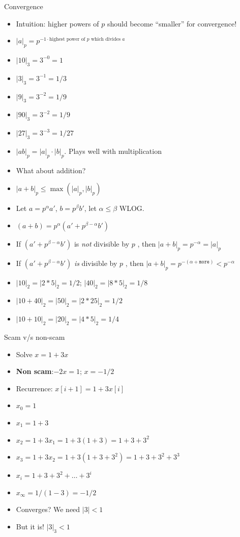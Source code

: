 \documentclass[8pt]{beamer}
\begin{document}
\begin{frame}{Convergence}

\begin{itemize}
\item Intuition: higher powers of $p$ should become ``smaller'' for convergence! \pause
\item $|a|_p = p^{-1 \cdot \text{highest power of } p \text { which divides } a}$\pause
\item $|10|_3 = 3^{-0} = 1$\pause
\item $|3|_3 = 3^{-1} = 1/3$\pause
\item $|9|_3 = 3^{-2} = 1/9$\pause
\item $|90|_3 = 3^{-2} = 1/9$\pause
\item $|27|_3 = 3^{-3} = 1/27$\pause
\item $|ab|_p = |a|_p \cdot |b|_p$. Plays well with multiplication \pause
\item What about addition? \pause
\item $|a+b|_p \leq \max(|a|_p, |b|_p)$\pause
\item Let $a = p^\alpha a'$, $b = p^\beta b'$, let $\alpha \leq \beta$ WLOG.\pause
\item $(a + b) = p^\alpha (a' + p^{\beta - \alpha} b')$\pause
\item If $(a' + p^{\beta - \alpha} b')$ is \emph{not} divisible by $p$ \pause , then $|a+b|_p = p^{-\alpha} = |a|_p$\pause
\item If $(a' + p^{\beta - \alpha} b')$ \emph{is} divisible by $p$ \pause, then $|a+b|_p = p^{-(\alpha + \texttt{more})} < p^{-\alpha}$\pause
\item $|10|_2 = |2 * 5|_2 = 1/2$; $|40|_2 = |8 * 5|_2 = 1/8$\pause
\item $|10 + 40|_2 = |50|_2 = |2 * 25|_2 = 1/2$\pause
\item $|10 + 10|_2 = |20|_2 = |4 * 5|_2 = 1/4$\pause
\end{itemize}
\end{frame}

\begin{frame}{Scam v/s non-scam}
\begin{itemize}
\item Solve $x = 1 + 3x$\pause
\item \textbf{Non scam}:$-2x = 1$\pause; $x = -1/2$\pause
\item Recurrence: $x[i+1] = 1 + 3x[i]$\pause
\item $x_0 = 1$\pause
\item $x_1 = 1 + 3$
\item $x_2 = 1 + 3x_1 = 1 + 3(1 + 3) = 1 + 3 + 3^2$\pause
\item $x_3 = 1 + 3x_2 = 1 + 3(1 + 3 + 3^2) = 1 + 3 + 3^2 + 3^3$\pause
\item $x_i = 1 + 3 + 3^2 + \dots + 3^i$\pause
\item $x_\infty = 1/(1-3) = -1/2$
\item Converges? We need $|3| < 1$\pause
\item But it is! $|3|_3 < 1$\pause
\end{itemize}
\end{frame}
\end{document}

